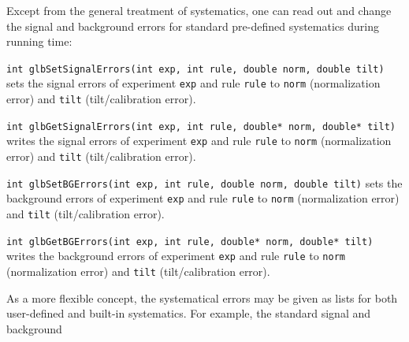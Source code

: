 Except from the general treatment of systematics, one can read out
and change the signal and background errors for standard pre-defined systematics
during running time:
\begin{function}
{\tt int glbSetSignalErrors(int exp, int rule, double norm, double tilt)}
sets the signal errors of experiment {\tt exp} and rule {\tt rule}
to {\tt norm} (normalization error) and {\tt tilt} (tilt/calibration error).
\end{function}
\begin{function}
{\tt int glbGetSignalErrors(int exp, int rule, double* norm, double* tilt)}
writes the signal errors of experiment {\tt exp} and rule {\tt rule}
to {\tt norm} (normalization error) and {\tt tilt} (tilt/calibration error).
\end{function}
\begin{function}
{\tt int glbSetBGErrors(int exp, int rule, double norm, double tilt)}
sets the background errors of experiment {\tt exp} and rule {\tt rule}
to {\tt norm} (normalization error) and {\tt tilt} (tilt/calibration error).
\end{function}
\begin{function}
{\tt int glbGetBGErrors(int exp, int rule, double* norm, double* tilt)}
writes the background errors of experiment {\tt exp} and rule {\tt rule}
to {\tt norm} (normalization error) and {\tt tilt} (tilt/calibration error).
\end{function}
%
As a more flexible concept, the systematical errors may be given as lists for
both user-defined and built-in systematics. For example, the standard signal and background

